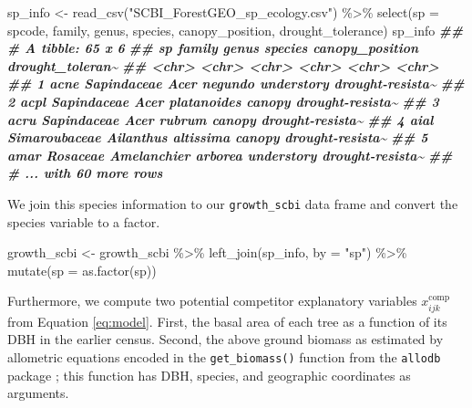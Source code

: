 \documentclass[12pt]{article}
\newenvironment{Shaded}{\begin{snugshade}}{\end{snugshade}}
\newcommand{\AttributeTok}[1]{\textcolor[rgb]{0.77,0.63,0.00}{#1}}
\newcommand{\DocumentationTok}[1]{\textcolor[rgb]{0.56,0.35,0.01}{\textbf{\textit{#1}}}}
\newcommand{\FunctionTok}[1]{\textcolor[rgb]{0.00,0.00,0.00}{#1}}
\newcommand{\NormalTok}[1]{#1}
\newcommand{\OtherTok}[1]{\textcolor[rgb]{0.56,0.35,0.01}{#1}}
\newcommand{\SpecialCharTok}[1]{\textcolor[rgb]{0.00,0.00,0.00}{#1}}
\newcommand{\StringTok}[1]{\textcolor[rgb]{0.31,0.60,0.02}{#1}}
\begin{document}
\begin{Shaded}
\begin{Highlighting}[]
\NormalTok{sp\_info }\OtherTok{\textless{}{-}} \FunctionTok{read\_csv}\NormalTok{(}\StringTok{"SCBI\_ForestGEO\_sp\_ecology.csv"}\NormalTok{) }\SpecialCharTok{\%\textgreater{}\%}
    \FunctionTok{select}\NormalTok{(}\AttributeTok{sp =}\NormalTok{ spcode, family, genus, species, canopy\_position, drought\_tolerance)}
\NormalTok{sp\_info}
\DocumentationTok{\#\# \# A tibble: 65 x 6}
\DocumentationTok{\#\#   sp    family        genus       species     canopy\_position drought\_toleran\textasciitilde{}}
\DocumentationTok{\#\#   \textless{}chr\textgreater{} \textless{}chr\textgreater{}         \textless{}chr\textgreater{}       \textless{}chr\textgreater{}       \textless{}chr\textgreater{}           \textless{}chr\textgreater{}           }
\DocumentationTok{\#\# 1 acne  Sapindaceae   Acer        negundo     understory      drought{-}resista\textasciitilde{}}
\DocumentationTok{\#\# 2 acpl  Sapindaceae   Acer        platanoides canopy          drought{-}resista\textasciitilde{}}
\DocumentationTok{\#\# 3 acru  Sapindaceae   Acer        rubrum      canopy          drought{-}resista\textasciitilde{}}
\DocumentationTok{\#\# 4 aial  Simaroubaceae Ailanthus   altissima   canopy          drought{-}resista\textasciitilde{}}
\DocumentationTok{\#\# 5 amar  Rosaceae      Amelanchier arborea     understory      drought{-}resista\textasciitilde{}}
\DocumentationTok{\#\# \# ... with 60 more rows}
\end{Highlighting}
\end{Shaded}

We join this species information to our \texttt{growth\_scbi} data frame
and convert the species variable to a factor.

\begin{Shaded}
\begin{Highlighting}[]
\NormalTok{growth\_scbi }\OtherTok{\textless{}{-}}\NormalTok{ growth\_scbi }\SpecialCharTok{\%\textgreater{}\%}
    \FunctionTok{left\_join}\NormalTok{(sp\_info, }\AttributeTok{by =} \StringTok{"sp"}\NormalTok{) }\SpecialCharTok{\%\textgreater{}\%}
    \FunctionTok{mutate}\NormalTok{(}\AttributeTok{sp =} \FunctionTok{as.factor}\NormalTok{(sp))}
\end{Highlighting}
\end{Shaded}

Furthermore, we compute two potential competitor explanatory variables
\(x^{\text{comp}}_{ijk}\) from Equation \ref{eq:model}. First, the basal
area of each tree as a function of its DBH in the earlier census.
Second, the above ground biomass as estimated by allometric equations
encoded in the \texttt{get\_biomass()} function from the \texttt{allodb}
package \citep{allodb_package}; this function has DBH, species, and
geographic coordinates as arguments.
\end{document}
